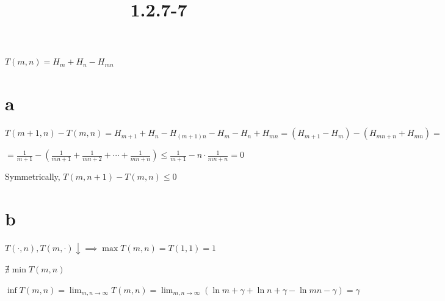 \documentclass{article}
\title{1.2.7-7}
\begin{document}
\maketitle

\( T(m, n) = H_m + H_n − H_{mn} \)

\section*{a}

\( T(m+1,n) - T(m,n) = H_{m+1} + H_n - H_{(m+1)n} - H_m - H_n + H_{mn} = (H_{m+1} - H_m) - (H_{mn+n} + H_{mn}) = \)

\( = \frac{1}{m+1} - (\frac{1}{mn+1} + \frac{1}{mn+2} + \cdots + \frac{1}{mn+n}) \leq \frac{1}{m+1} - n \cdot \frac{1}{mn+n} = 0 \)

Symmetrically, \( T(m, n + 1) - T(m,n) \leq 0 \)

\section*{b}

\( T(\cdot, n), T(m, \cdot) \downarrow \implies \max T(m,n) = T(1,1) = 1 \)

\( \nexists \min T(m,n) \)

\( \inf T(m,n) = \lim_{m,n \to \infty} T(m,n) = \lim_{m,n \to \infty} (\ln m + \gamma + \ln{n} + \gamma - \ln{mn} -\gamma) = \gamma \)
\end{document}
